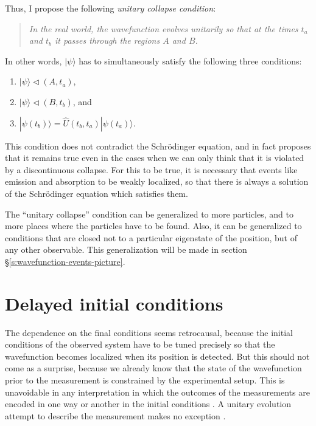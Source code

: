 \documentclass[12pt]{amsart}
\theoremstyle{definition}
\theoremstyle{plain}
\begin{document}
Thus, I propose the following \emph{unitary collapse condition}:
\begin{quote} 
\label{condition:unitary_collapse}
\emph{In the real world, the wavefunction evolves unitarily so that at the times $t_a$ and $t_b$ it passes through the regions $A$ and $B$.}
\end{quote}

In other words, $|{\psi}\rangle$ has to simultaneously satisfy the following three conditions:
\begin{enumerate}
	\item 
$|{\psi}\rangle\triangleleft(A,t_a)$,
	\item 
$|{\psi}\rangle\triangleleft(B,t_b)$, and 
	\item 
$|{\psi(t_b)}\rangle=\hat U(t_b,t_a)|{\psi(t_a)}\rangle$.
\end{enumerate}

This condition does not contradict the Schr\"odinger equation, and in fact proposes that it remains true even in the cases when we can only think that it is violated by a discontinuous collapse. For this to be true, it is necessary that events like emission and absorption to be weakly localized, so that there is always a solution of the Schr\"odinger equation which satisfies them.

The ``unitary collapse'' condition can be generalized to more particles, and to more places where the particles have to be found. Also, it can be generalized to conditions that are closed not to a particular eigenstate of the position, but of any other observable. This generalization will be made in section \S\ref{s:wavefunction-events-picture}.



\section{Delayed initial conditions}
\label{s:delayed_initial_conditions}


The dependence on the final conditions seems retrocausal, because the initial conditions of the observed system have to be tuned precisely so that the wavefunction becomes localized when its position is detected. But this should not come as a surprise, because we already know that the state of the wavefunction prior to the measurement is constrained by the experimental setup. This is unavoidable in any interpretation in which the outcomes of the measurements are encoded in one way or another in the initial conditions \cite{Bel66,Bel64,KochenSpecker1967HiddenVariables}. A unitary evolution attempt to describe the measurement makes no exception \cite{Sto12QMb}.
\end{document}
